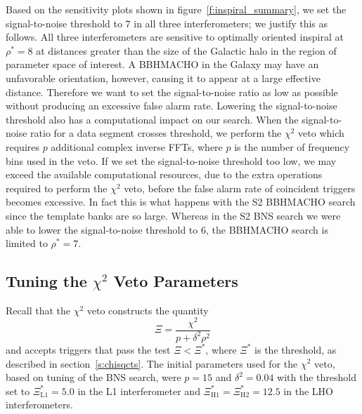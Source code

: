 Based on the sensitivity plots shown in figure~\ref{f:inspiral_summary}, we
set the signal-to-noise threshold to $7$ in all three interferometers; we
justify this as follows. All three interferometers are sensitive to optimally
oriented inspiral at $\rho^\ast = 8$ at distances greater than the size of the
Galactic halo in the region of parameter space of interest. A BBHMACHO in the
Galaxy may have an unfavorable orientation, however, causing it to appear at
a large effective distance. Therefore we want to set the signal-to-noise ratio
as low as possible without producing an excessive false alarm rate. Lowering
the signal-to-noise threshold also has a computational impact on our search.
When the signal-to-noise ratio for a data segment crosses threshold, we
perform the $\chi^2$ veto which requires $p$ additional complex inverse FFTs,
where $p$ is the number of frequency bins used in the veto. If we set the
signal-to-noise threshold too low, we may exceed the available computational
resources, due to the extra operations required to perform the $\chi^2$ veto,
before the false alarm rate of coincident triggers becomes excessive. In fact
this is what happens with the S2 BBHMACHO search since the template banks are
so large. Whereas in the S2 BNS search we were able to lower the
signal-to-noise threshold to $6$, the BBHMACHO search is limited to $\rho^\ast
= 7$.

\subsection{Tuning the $\chi^2$ Veto Parameters}
\label{ss:chisqtuning}

Recall that the $\chi^2$ veto constructs the quantity
\begin{equation}
\Xi = \frac{\chi^2}{p + \delta^2\rho^2}
\end{equation}
and accepts triggers that pass the test $\Xi < \Xi^\ast$, where $\Xi^\ast$ is
the threshold, as described in section~\ref{s:chisqcts}.
The initial parameters used for the $\chi^2$ veto, based on tuning of the BNS
search, were $p = 15$ and $\delta^2 = 0.04$ with the threshold set to
$\Xi^\ast_\mathrm{L1} = 5.0$ in the L1 interferometer and
$\Xi^\ast_\mathrm{H1} = \Xi^\ast_\mathrm{H2} = 12.5$ in the LHO
interferometers. 

